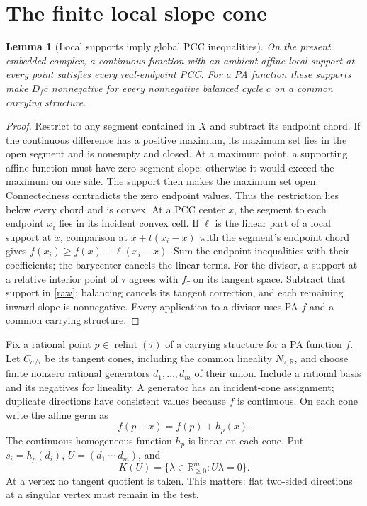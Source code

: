 \documentclass[11pt]{article}
\newtheorem{lemma}[theorem]{Lemma}
\newcommand{\R}{\mathbb R}
\newcommand{\relint}{\operatorname{relint}}
\begin{document}
\section{The finite local slope cone}
\begin{lemma}[Local supports imply global PCC inequalities]\label{localglobal}
On the present embedded complex, a continuous function with an ambient
affine local support at every point satisfies every real-endpoint PCC.
For a PA function these supports make \(D_f c\) nonnegative for every
nonnegative balanced cycle \(c\) on a common carrying structure.
\end{lemma}
\begin{proof}
Restrict to any segment contained in \(X\) and subtract its endpoint
chord. If the continuous difference has a positive maximum, its maximum
set lies in the open segment and is nonempty and closed. At a maximum
point, a supporting affine function must have zero segment slope:
otherwise it would exceed the maximum on one side. The support then
makes the maximum set open. Connectedness contradicts the zero endpoint
values. Thus the restriction lies below every chord and is convex.
At a PCC center \(x\), the segment to each endpoint \(x_i\) lies in its
incident convex cell. If \(\ell\) is the linear part of a local support
at \(x\), comparison at \(x+t(x_i-x)\) with the segment's endpoint
chord gives \(f(x_i)\geq f(x)+\ell(x_i-x)\). Sum the endpoint
inequalities with their coefficients; the barycenter cancels the
linear terms. For the divisor, a support at a relative interior point
of \(\tau\) agrees with \(f_\tau\) on its tangent space. Subtract that
support in \eqref{raw}; balancing cancels its tangent correction,
and each remaining inward slope is nonnegative. Every application
to a divisor uses PA \(f\) and a common carrying structure.
\end{proof}
Fix a rational point \(p\in\relint(\tau)\) of a carrying structure for a
PA function \(f\). Let \(C_{\sigma/\tau}\) be its tangent cones, including
the common lineality \(N_{\tau,\R}\), and choose finite nonzero rational
generators \(d_1,\ldots,d_m\) of their union. Include a rational basis and
its negatives for lineality. A generator has an incident-cone assignment;
duplicate directions have consistent values because \(f\) is continuous.
On each cone write the affine germ as
\[
 f(p+x)=f(p)+h_p(x).
\]
The continuous homogeneous function \(h_p\) is linear on each cone.
Put \(s_i=h_p(d_i)\), \(U=(d_1\ \cdots\ d_m)\), and
\[
 K(U)=\{\lambda\in\R_{\geq0}^m:U\lambda=0\}.
\]
At a vertex no tangent quotient is taken. This matters: flat two-sided
directions at a singular vertex must remain in the test.
\end{document}
